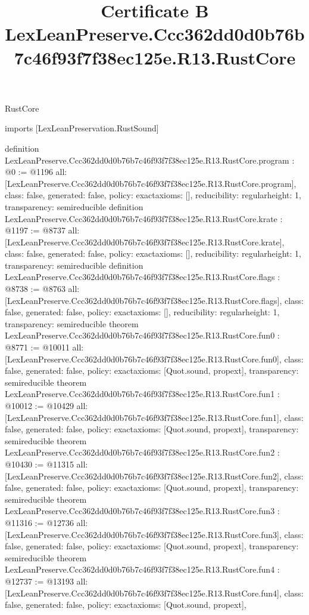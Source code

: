 \begin{lexlean}{RustCore}
\title{Certificate B LexLeanPreserve.Ccc362dd0d0b76b7c46f93f7f38ec125e.R13.RustCore}
\begin{coremodule}
imports [LexLeanPreservation.RustSound]

definition LexLeanPreserve.Ccc362dd0d0b76b7c46f93f7f38ec125e.R13.RustCore.program : @0 := @1196 {
  all: [LexLeanPreserve.Ccc362dd0d0b76b7c46f93f7f38ec125e.R13.RustCore.program],
  class: false,
  generated: false,
  policy: exact{axioms: []},
  reducibility: regular{height: 1},
  transparency: semireducible
}
definition LexLeanPreserve.Ccc362dd0d0b76b7c46f93f7f38ec125e.R13.RustCore.krate : @1197 := @8737 {
  all: [LexLeanPreserve.Ccc362dd0d0b76b7c46f93f7f38ec125e.R13.RustCore.krate],
  class: false,
  generated: false,
  policy: exact{axioms: []},
  reducibility: regular{height: 1},
  transparency: semireducible
}
definition LexLeanPreserve.Ccc362dd0d0b76b7c46f93f7f38ec125e.R13.RustCore.flags : @8738 := @8763 {
  all: [LexLeanPreserve.Ccc362dd0d0b76b7c46f93f7f38ec125e.R13.RustCore.flags],
  class: false,
  generated: false,
  policy: exact{axioms: []},
  reducibility: regular{height: 1},
  transparency: semireducible
}
theorem LexLeanPreserve.Ccc362dd0d0b76b7c46f93f7f38ec125e.R13.RustCore.fun0 : @8771 := @10011 {
  all: [LexLeanPreserve.Ccc362dd0d0b76b7c46f93f7f38ec125e.R13.RustCore.fun0],
  class: false,
  generated: false,
  policy: exact{axioms: [Quot.sound, propext]},
  transparency: semireducible
}
theorem LexLeanPreserve.Ccc362dd0d0b76b7c46f93f7f38ec125e.R13.RustCore.fun1 : @10012 := @10429 {
  all: [LexLeanPreserve.Ccc362dd0d0b76b7c46f93f7f38ec125e.R13.RustCore.fun1],
  class: false,
  generated: false,
  policy: exact{axioms: [Quot.sound, propext]},
  transparency: semireducible
}
theorem LexLeanPreserve.Ccc362dd0d0b76b7c46f93f7f38ec125e.R13.RustCore.fun2 : @10430 := @11315 {
  all: [LexLeanPreserve.Ccc362dd0d0b76b7c46f93f7f38ec125e.R13.RustCore.fun2],
  class: false,
  generated: false,
  policy: exact{axioms: [Quot.sound, propext]},
  transparency: semireducible
}
theorem LexLeanPreserve.Ccc362dd0d0b76b7c46f93f7f38ec125e.R13.RustCore.fun3 : @11316 := @12736 {
  all: [LexLeanPreserve.Ccc362dd0d0b76b7c46f93f7f38ec125e.R13.RustCore.fun3],
  class: false,
  generated: false,
  policy: exact{axioms: [Quot.sound, propext]},
  transparency: semireducible
}
theorem LexLeanPreserve.Ccc362dd0d0b76b7c46f93f7f38ec125e.R13.RustCore.fun4 : @12737 := @13193 {
  all: [LexLeanPreserve.Ccc362dd0d0b76b7c46f93f7f38ec125e.R13.RustCore.fun4],
  class: false,
  generated: false,
  policy: exact{axioms: [Quot.sound, propext]},
}
\end{coremodule}
\end{lexlean}
